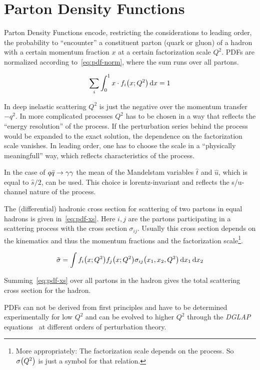 
\section{Parton Density Functions}%
\label{sec:pdf_basics}

Parton Density Functions encode, restricting the considerations to
leading order, the probability to ``encounter'' a constituent parton
(quark or gluon) of a hadron with a certain momentum fraction \(x\) at
a certain factorization scale \(Q^2\). PDFs are normalized according
to~\eqref{eq:pdf-norm}, where the sum runs over all partons.

\begin{equation}
  \label{eq:pdf-norm}
  \sum_i\int_0^1x\cdot f_i\qty(x;Q^2) \dd{x} = 1
\end{equation}

In deep inelastic scattering \(Q^2\) is just the negative over the
momentum transfer \(-q^2\). In more complicated processes \(Q^2\) has
to be chosen in a way that reflects the ``energy resolution'' of the
process. If the perturbation series behind the process would be
expanded to the exact solution, the dependence on the factorization
scale vanishes. In leading order, one has to choose the scale in a
``physically meaningfull'' way, which reflects characteristics of the
process.

In the case of \(q\bar{q}\rightarrow\gamma\gamma\) the mean of the Mandelstam variables \(\hat{t}\)
and \(\hat{u}\), which is equal to \(\hat{s}/2\), can be used. This
choice is lorentz-invariant and reflects the s/u-channel nature of the
process.

The (differential) hadronic cross section for scattering of two
partons in equal hadrons is given in~\eqref{eq:pdf-xs}. Here \(i,j\) are
the partons participating in a scattering process with the cross
section \(\sigma_{ij}\). Usually this cross section depends on the
kinematics and thus the momentum fractions and the factorization
scale\footnote{More appropriately: The factorization scale depends on
  the process. So \(\sigma\qty(Q^2)\) is just a symbol for that
  relation.}.

\begin{equation}
  \label{eq:pdf-xs}
  \tilde{\sigma} = \int f_i\qty(x;Q^2) f_j\qty(x;Q^2) \sigma_{ij}\qty(x_1,
  x_2, Q^2)\dd{x_1}\dd{x_2}
\end{equation}

Summing~\eqref{eq:pdf-xs} over all partons in the hadron gives
the total scattering cross section for the hadron.

PDFs can not be derived from first principles and have to be
determined experimentally for low \(Q^2\) and can be evolved to higher
\(Q^2\) through the \emph{DGLAP} equations~\cite{altarelli:1977af} at
different orders of perturbation theory.
